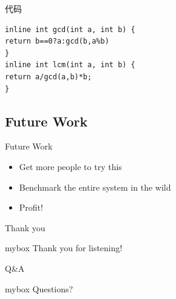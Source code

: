\documentclass[10pt,aspectratio=43,mathserif]{beamer}
\begin{document}
\begin{frame}[fragile]{代码}
\begin{lstlisting}
inline int gcd(int a, int b) { 
return b==0?a:gcd(b,a%b)
}
inline int lcm(int a, int b) {
return a/gcd(a,b)*b;
}
\end{lstlisting}
\end{frame}


\subsection{Future Work}
\begin{frame}{Future Work}  %
\begin{itemize}
\item Get more people to try this
\item Benchmark the entire system in the wild
\item Profit!
\end{itemize}
\end{frame}

\begin{frame}{Thank you}
\begin{center}
\begin{minipage}{1\textwidth}
 \begin{beamercolorbox}[wd=0.70\textwidth, rounded=true, shadow=true]{mybox}
\LARGE \centering Thank you for listening!  %
\end{beamercolorbox}
 \end{minipage}
\end{center}
\end{frame}

\begin{frame}{Q\&A}
\begin{center}
	\begin{minipage}{1\textwidth}
		\begin{beamercolorbox}[wd=0.70\textwidth, rounded=true, shadow=true]{mybox}
			\LARGE \centering  Questions?  %
		\end{beamercolorbox}
	\end{minipage}
\end{center}
\end{frame}

\end{document}
